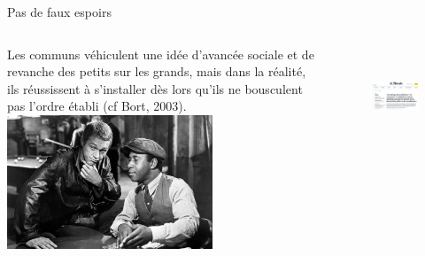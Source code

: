\documentclass[newPxFont]{beamer}
\begin{document}
\begin{frame}[c]{Pas de faux espoirs}
\vspace{-1cm}
\begin{columns}[onlytextwidth,T]
  \column{\dimexpr\linewidth-30mm-5mm}
  \small{Les communs véhiculent une idée d'avancée sociale et de revanche des petits sur les grands, mais dans la réalité, ils réussissent à s'installer dès lors qu'ils ne bousculent pas l'ordre établi (cf Bort, 2003).}\\
  \vspace{0.5cm}
  \includegraphics[height=4cm]{img/thecincinnatiKid.jpg}

  \column{35mm}
  \begin{figure}
    \includegraphics[height=3cm]{img/leMonde301023.png}
  \end{figure}

\end{columns}
\end{frame}
\end{document}
